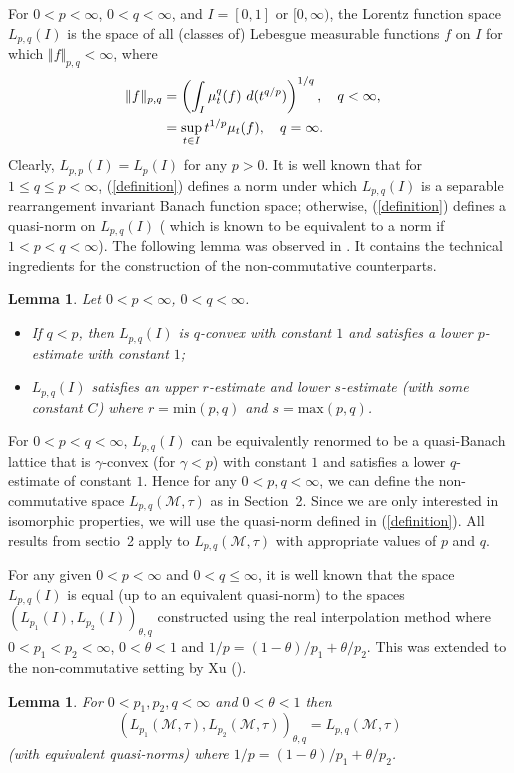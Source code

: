 \documentclass[12pt]{amsart}
\let\cal\mathcal
\newtheorem{lemma}[theorem]{Lemma}
\def\m{{\cal M}}
\numberwithin{equation}{section}
\numberwithin{theorem}{section}
\begin{document}
For $0<p<\infty$, $0<q<\infty$, and $I = [0,1]$ or $[0,\infty)$, the Lorentz
function space $L_{p,q}(I)$ is the space of all (classes of) Lebesgue
measurable functions $f$ on $I$ for which $\Vert f \Vert_{p,q} < \infty$,
 where
\begin{equation}\label{definition}
\begin{split}
\Vert f \Vert_{p,q} &= \left(\int_{I} \mu_{t}^{q}(f)\ 
d(t^{q/p})\right)^{1/q}, \quad q < \infty, \cr
&= \sup_{t \in I} t^{1/p} \mu_t(f), \quad q= \infty.
\end{split}\end{equation}
Clearly, $L_{p,p}(I)=L_p(I)$ for any $p>0$. It is well known that
for $1 \leq q \leq p < \infty$, (\ref{definition}) defines a norm under which 
$L_{p,q}(I)$ is a separable rearrangement invariant Banach function space;
otherwise, (\ref{definition}) defines a quasi-norm on $L_{p,q}(I)$ ( which is known to be 
equivalent to a norm  
 if $1<p<q<\infty$). The following lemma was observed in \cite{CADI2}. It
contains the technical ingredients for the construction of the 
non-commutative counterparts. 

\begin{lemma}
Let $0<p<\infty$, $0<q<\infty$.
\begin{itemize}
\item[(i)] If $q<p$, then $L_{p,q}(I)$ is $q$-convex with constant $1$ and
satisfies a lower $p$-estimate with constant $1$;
\item[(ii)] $L_{p,q}(I)$ satisfies an upper $r$-estimate
and  lower $s$-estimate (with some constant $C$) where 
$r=\text{min}(p,q)$ and $s=\text{max}(p,q)$.
\end{itemize}
\end{lemma}

For $0<p<q<\infty$, $L_{p,q}(I)$ can be equivalently renormed to be a 
quasi-Banach lattice that is $\gamma$-convex (for $\gamma <p$) with 
constant $1$ and satisfies a lower $q$-estimate of constant $1$. Hence
for any $0<p,q <\infty$, we can define the non-commutative 
space $L_{p,q}(\m,\tau)$ as in Section~2. 
Since we are only interested in isomorphic properties, we will
use the quasi-norm defined in (\ref{definition}). All results
from sectio~2 apply to $L_{p,q}(\m,\tau)$ with appropriate
values of $p$ and $q$.  


  For any given $0<p<\infty$ and $0<q\leq \infty$,
it is well known that the space
 $L_{p,q}(I)$  is equal
(up to an equivalent quasi-norm) to the spaces $(L_{p_{1}}(I),
L_{p_{2}}(I))_{\theta,q}$ constructed using the real interpolation method
where $0<p_{1}<p_{2}<\infty$,  $0 < \theta < 1$ and $1/p=
(1-\theta)/{p_{1}}+ \theta/{p_{2}}$. This was extended to the
non-commutative setting by Xu (\cite{X2}).
\begin{lemma}\label{interpolation}
For $0<p_1, p_2, q<\infty$ and 
 $0<\theta<1$ then
$$(L_{p_1}(\m,\tau), L_{p_2}(\m,\tau))_{\theta,q} =
L_{p,q}(\m,\tau)$$
(with equivalent quasi-norms) where 
$1/p=(1-\theta)/{p_{1}}+ \theta/{p_{2}}$.
\end{lemma}
\end{document}
